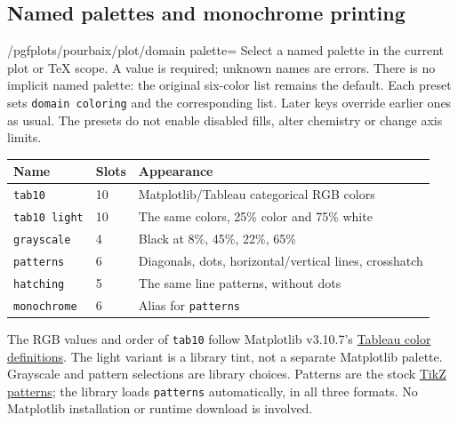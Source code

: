 \documentclass[a4paper,11pt]{ltxdoc}
\begin{document}
\subsection{Named palettes and monochrome printing}
\begin{key}{/pgfplots/pourbaix/plot/domain palette=}
Select a named palette in the current plot or TeX scope. A value is required;
unknown names are errors. There is no implicit named palette: the original
six-color list remains the default. Each preset sets \texttt{domain coloring}
and the corresponding list. Later keys override earlier ones as usual.
The presets do not enable disabled fills, alter chemistry or change axis limits.
\begin{center}
\begin{tabular}{lll}
Name & Slots & Appearance\\\hline
\texttt{tab10} & 10 & Matplotlib/Tableau categorical RGB colors\\
\texttt{tab10 light} & 10 & The same colors, 25\% color and 75\% white\\
\texttt{grayscale} & 4 & Black at 8\%, 45\%, 22\%, 65\%\\
\texttt{patterns} & 6 & Diagonals, dots, horizontal/vertical lines, crosshatch\\
\texttt{hatching} & 5 & The same line patterns, without dots\\
\texttt{monochrome} & 6 & Alias for \texttt{patterns}
\end{tabular}
\end{center}
The RGB values and order of \texttt{tab10} follow Matplotlib v3.10.7's
\href{https://github.com/matplotlib/matplotlib/blob/v3.10.7/lib/matplotlib/_color_data.py}{Tableau color definitions}.
The light variant is a library tint, not a separate Matplotlib palette.
Grayscale and pattern selections are library choices. Patterns are the stock
\href{https://tikz.dev/library-patterns}{TikZ patterns}; the library loads
\texttt{patterns} automatically, in all three formats. No Matplotlib installation
or runtime download is involved.
\end{key}
\end{document}
